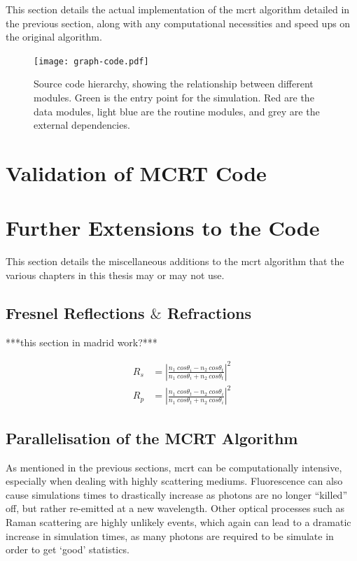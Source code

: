 This section details the actual implementation of the \gls{mcrt} algorithm detailed in the previous section, along with any computational necessities and speed ups on the original algorithm.

\begin{figure}[!ht]
	\centering
	\texttt{[image: graph-code.pdf]}
	\caption{Source code hierarchy, showing the relationship between different modules. Green is the entry point for the simulation. Red are the data modules, light blue are the routine modules, and grey are the external dependencies.}
	\label{fig:codegraph}
\end{figure}

\section{Validation of MCRT Code}


\section{Further Extensions to the Code}\label{sec:codefurther}
This section details the miscellaneous additions to the \gls{mcrt} algorithm that the various chapters in this thesis may or may not use.

\subsection{Fresnel Reflections \texorpdfstring{$\&$}{and} Refractions}\label{sec:fresnel}
***this section in madrid work?***


\begin{align}
	R_s&=\left|\frac{n_1\ cos\theta_i-n_2\ cos\theta_t}{n_1\ cos\theta_i+n_2\ cos\theta_t}\right|^2\\
	R_p&=\left|\frac{n_1\ cos\theta_t-n_2\ cos\theta_i}{n_1\ cos\theta_t+n_2\ cos\theta_i}\right|^2
\end{align}
\subsection{Parallelisation of the MCRT Algorithm}\label{sec:parasec}

As mentioned in the previous sections, \gls{mcrt} can be computationally intensive, especially when dealing with highly scattering mediums. Fluorescence can also cause simulations times to drastically increase as photons are no longer ``killed'' off, but rather re-emitted at a new wavelength. Other optical processes such as Raman scattering are highly unlikely events, which again can lead to a dramatic increase in simulation times, as many photons are required to be simulate in order to get `good' statistics.

